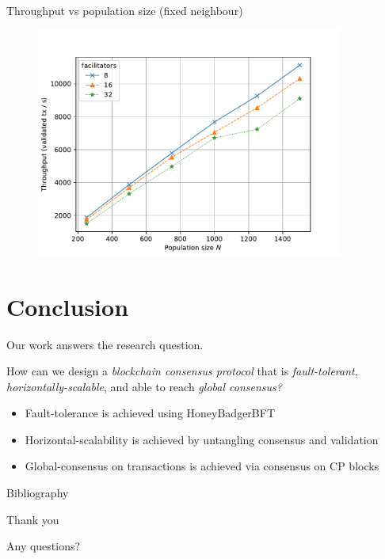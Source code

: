 \documentclass{beamer}
\begin{document}
\begin{frame}{Throughput vs population size (fixed neighbour)}
  \begin{figure}[h]
  \includegraphics[width=0.9\textwidth]{throughput-vs-population-large}
  \centering
  \end{figure}
\end{frame}

\section{Conclusion}
\begin{frame}{\secname}
  Our work answers the research question.
  \begin{block}{}
    How can we design a \emph{blockchain consensus protocol} that is \emph{fault-tolerant},
    \emph{horizontally-scalable}, and able to reach \emph{global consensus?}
  \end{block}
  \begin{itemize}
    \item Fault-tolerance is achieved using HoneyBadgerBFT
    \item Horizontal-scalability is achieved by untangling consensus and validation
    \item Global-consensus on transactions is achieved via consensus on CP blocks
  \end{itemize}
\end{frame}

\begin{frame}{Bibliography}
\printbibliography
\end{frame}

\begin{frame}{Thank you}
  \begin{center}
    \Large{
  Any questions?
    }
  \end{center}
\end{frame}
\end{document}
